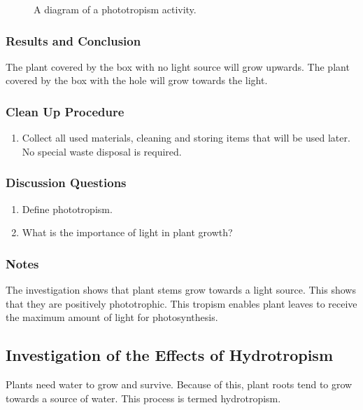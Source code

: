 \begin{figure}[h]
\begin{center}
\def\svgwidth{8cm}

\caption{A diagram of a phototropism activity.}
\label{fig:phototropism}
\end{center}
\end{figure}

\subsubsection*{Results and Conclusion}
The plant covered by the box with no light source will grow upwards. The plant covered by the box with the hole will grow towards the light.

\subsubsection*{Clean Up Procedure}
\begin{enumerate}
\item{Collect all used materials, cleaning and storing items that will be used later. No special waste disposal is required.}
\end{enumerate}

\subsubsection*{Discussion Questions}
\begin{enumerate}
\item{Define phototropism.}
\item{What is the importance of light in plant growth?}
\end{enumerate}

\subsubsection*{Notes}
The investigation shows that plant stems grow towards a light source. This shows that they are positively phototrophic. This tropism enables plant leaves to receive the maximum amount of light for photosynthesis.

\subsection{Investigation of the Effects of Hydrotropism}
Plants need water to grow and survive. Because of this, plant roots tend to grow towards a source of water. This process is termed hydrotropism.


